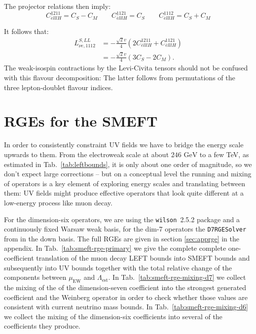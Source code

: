 The projector relations then imply:
\begin{equation}
     C_{\bar elllH}^{1211}=C_S-C_M
 \qquad
 C_{\bar elllH}^{1121}=C_S
 \qquad
 C_{\bar elllH}^{1112}=C_S+C_M
\end{equation}

It follows that:
\begin{align}
 L_{\nu e,1112}^{S,LL}
 &=-\frac{\sqrt2v}{4}
   \left(2C_{\bar elllH}^{1211}
         +C_{\bar elllH}^{1121}\right)
 \nonumber\\
 &=-\frac{\sqrt2v}{4}\left(3C_S-2C_M\right).
 \label{eq:SLL-SM-decomposition}
\end{align}
The weak-isospin contractions by the Levi-Civita tensors should not be
confused with this flavour decomposition: The latter follows from
permutations of the three lepton-doublet flavour indices.
\section{RGEs for the SMEFT}
In order to consistently constraint UV fields we have to bridge the energy scale upwards to them. From the electroweak scale at about $246\text{ GeV}$ to a few TeV, as estimated in Tab.~\ref{tab:leftbounds}, it is only about one order of magnitude, so we don't expect large corrections -- but on a conceptual level the running and mixing of operators is a key element of exploring energy scales and translating between them: UV fields might produce effective operators that look quite different at a low-energy process like muon decay.\par 
For the dimension-six operators, we are using the \texttt{wilson}~2.5.2 package \parencite{aebischer2018python} and a continuously fixed Warsaw weak basis, for the dim-7 operators the \texttt{D7RGESolver} from \parencite{liao2025rge} in the down basis.
The full RGEs are given in section \ref{sec:apprge} in the appendix. In Tab.~\ref{tab:smeft-rge-primary} we give the complete complete one-coefficient translation of the muon decay LEFT bounds into SMEFT bounds and subsequently into UV bounds together with the total relative change of the components between $\mu_\text{EW}$ and $\Lambda_\text{est}$. In Tab.~\ref{tab:smeft-rge-mixing-d7} we collect the mixing of the of the dimension-seven coefficient into the strongest generated coefficient and the Weinberg operator in order to check whether those values are consistent with current neutrino mass bounds. In Tab.~\ref{tab:smeft-rge-mixing-d6} we collect the mixing of the dimension-six coefficients into several of the coefficients they produce.\par 
